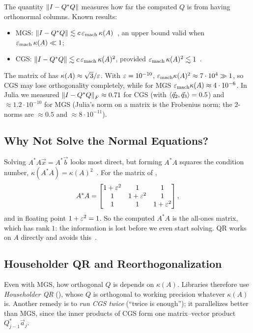 The quantity $\left\lVert I - Q^\ast Q \right\rVert$ measures how far the computed $Q$ is from having orthonormal columns. Known results:
\begin{itemize}
  \item MGS: $\left\lVert I - Q^\ast Q \right\rVert \lesssim c\,\varepsilon_{\mathrm{mach}}\,\kappa(A)$~\cite{Bjorck1967}, an upper bound valid when $\varepsilon_{\mathrm{mach}}\,\kappa(A) \ll 1$;
  \item CGS: $\left\lVert I - Q^\ast Q \right\rVert \lesssim c\,\varepsilon_{\mathrm{mach}}\,\kappa(A)^2$, provided $\varepsilon_{\mathrm{mach}}\,\kappa(A)^2 \lesssim 1$~\cite{GLRE2005}.
\end{itemize}
The matrix of  has $\kappa(A) \approx \sqrt{3}/\varepsilon$. With $\varepsilon = 10^{-10}$, $\varepsilon_{\mathrm{mach}}\kappa(A)^2 \approx 7 \cdot 10^{4} \gg 1$, so CGS may lose orthogonality completely, while for MGS $\varepsilon_{\mathrm{mach}}\kappa(A) \approx 4 \cdot 10^{-6}$. In Julia we measured $\left\lVert I - Q^\ast Q \right\rVert_F \approx 0.71$ for CGS (with $\left\langle \vec{q}_2, \vec{q}_3 \right\rangle = 0.5$) and $\approx 1.2 \cdot 10^{-10}$ for MGS (Julia's norm on a matrix is the Frobenius norm; the $2$-norms are $\approx 0.5$ and $\approx 8 \cdot 10^{-11}$).

\subsection{Why Not Solve the Normal Equations?}

Solving $A^\ast A\vec{x} = A^\ast\vec{b}$ looks most direct, but forming $A^\ast A$ squares the condition number, $\kappa(A^\ast A) = \kappa(A)^2$~\cite[Lecture 11]{TB}. For the matrix of ,
\begin{equation}
  A^\ast A = \begin{bmatrix} 1 + \varepsilon^2 & 1 & 1 \\ 1 & 1 + \varepsilon^2 & 1 \\ 1 & 1 & 1 + \varepsilon^2 \end{bmatrix},
\end{equation}
and in floating point $1 + \varepsilon^2 = 1$. So the computed $A^\ast A$ is the all-ones matrix, which has rank $1$: the information is lost before we even start solving. QR works on $A$ directly and avoids this~\cite[\S3.3]{Demmel}.

\subsection{Householder QR and Reorthogonalization}

Even with MGS, how orthogonal $Q$ is depends on $\kappa(A)$. Libraries therefore use \emph{Householder QR} (), whose $Q$ is orthogonal to working precision whatever $\kappa(A)$ is. Another remedy is to \emph{run CGS twice} (``twice is enough''); it parallelizes better than MGS, since the inner products of CGS form one matrix--vector product $Q_{j-1}^\ast\vec{a}_j$.
